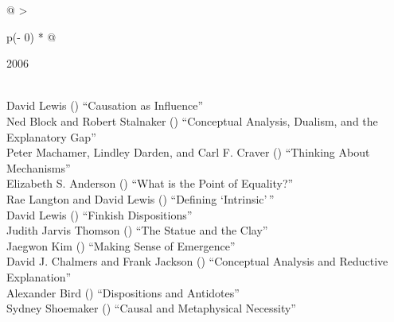 \documentclass[
  10pt,
  letterpaper,
  DIV=11,
  numbers=noendperiod,
  twoside]{scrartcl}
\begin{document}
\begin{longtable}[]{@{}
  >{\raggedright\arraybackslash}p{(\columnwidth - 0\tabcolsep) * }@{}}

\caption{\label{tbl-top-ten-1997}Most cited articles published less than
ten years ago as of 2006.}

\tabularnewline

\toprule\noalign{}
\begin{minipage}[b]{\linewidth}\raggedright
2006
\end{minipage} \\
\midrule\noalign{}
\endhead
\bottomrule\noalign{}
\endlastfoot
David Lewis
()
``Causation as Influence'' \\
Ned Block and Robert Stalnaker
()
``Conceptual Analysis, Dualism, and the Explanatory Gap'' \\
Peter Machamer, Lindley Darden, and Carl F. Craver
()
``Thinking About Mechanisms'' \\
Elizabeth S. Anderson
()
``What is the Point of Equality?'' \\
Rae Langton and David Lewis
()
``Defining `Intrinsic'\,'' \\
David Lewis
()
``Finkish Dispositions'' \\
Judith Jarvis Thomson
()
``The Statue and the Clay'' \\
Jaegwon Kim
()
``Making Sense of Emergence'' \\
David J. Chalmers and Frank Jackson
()
``Conceptual Analysis and Reductive Explanation'' \\
Alexander Bird
()
``Dispositions and Antidotes'' \\
Sydney Shoemaker
()
``Causal and Metaphysical Necessity'' \\

\end{longtable}
\end{document}
